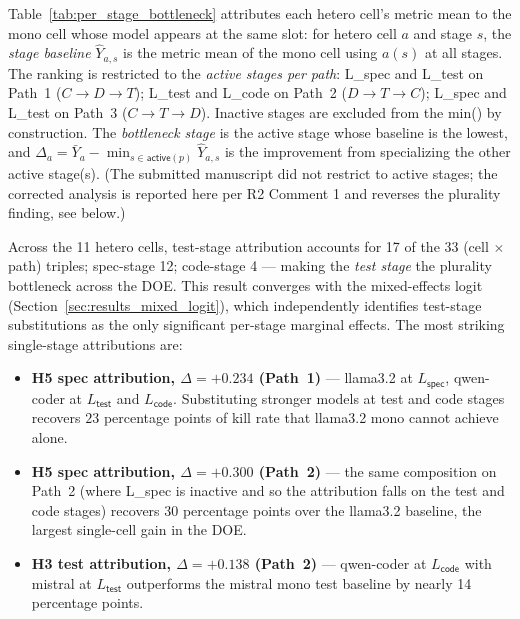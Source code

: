 

Table~\ref{tab:per_stage_bottleneck} attributes each hetero cell's metric mean to the mono cell whose model appears at the same slot: for hetero cell $a$ and stage $s$, the \emph{stage baseline} $\hat{Y}_{a,s}$ is the metric mean of the mono cell using $a(s)$ at all stages. The ranking is restricted to the \emph{active stages per path}: L\_spec and L\_test on Path~1 ($C \to D \to T$); L\_test and L\_code on Path~2 ($D \to T \to C$); L\_spec and L\_test on Path~3 ($C \to T \to D$). Inactive stages are excluded from the min() by construction. The \emph{bottleneck stage} is the active stage whose baseline is the lowest, and $\Delta_a = \bar{Y}_a - \min_{s \in \textsf{active}(p)} \hat{Y}_{a,s}$ is the improvement from specializing the other active stage(s). (The submitted manuscript did not restrict to active stages; the corrected analysis is reported here per R2 Comment 1 and reverses the plurality finding, see below.)

Across the 11 hetero cells, test-stage attribution accounts for 17 of the 33 (cell $\times$ path) triples; spec-stage 12; code-stage 4 --- making the \emph{test stage} the plurality bottleneck across the DOE. This result converges with the mixed-effects logit (Section~\ref{sec:results_mixed_logit}), which independently identifies test-stage substitutions as the only significant per-stage marginal effects. The most striking single-stage attributions are:

\begin{itemize}
  \item \textbf{H5 spec attribution, $\Delta = +0.234$ (Path~1)} --- llama3.2 at $L_{\textsf{spec}}$, qwen-coder at $L_{\textsf{test}}$ and $L_{\textsf{code}}$. Substituting stronger models at test and code stages recovers $23$ percentage points of kill rate that llama3.2 mono cannot achieve alone.
  \item \textbf{H5 spec attribution, $\Delta = +0.300$ (Path~2)} --- the same composition on Path~2 (where L\_spec is inactive and so the attribution falls on the test and code stages) recovers $30$ percentage points over the llama3.2 baseline, the largest single-cell gain in the DOE.
  \item \textbf{H3 test attribution, $\Delta = +0.138$ (Path~2)} --- qwen-coder at $L_{\textsf{code}}$ with mistral at $L_{\textsf{test}}$ outperforms the mistral mono test baseline by nearly 14 percentage points.
\end{itemize}


